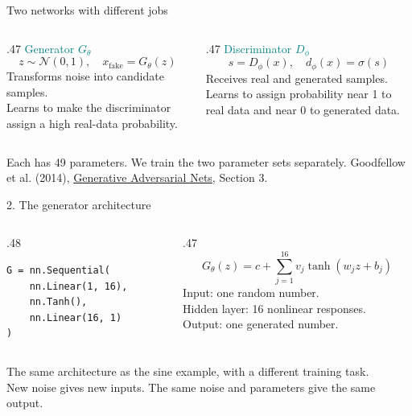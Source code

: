 \documentclass[aspectratio=169,11pt]{beamer}
\newcommand{\ganref}{\vfill{\tiny\color{gray}Goodfellow et al. (2014), \href{https://arxiv.org/abs/1406.2661}{Generative Adversarial Nets}, Section 3.}}
\begin{document}
\begin{frame}{Two networks with different jobs}
\begin{columns}[t]
\begin{column}{.47\textwidth}
\textcolor{Teal}{\large Generator $G_\theta$}
\[z\sim\mathcal N(0,1),\quad x_{\mathrm{fake}}=G_\theta(z)\]
Transforms noise into candidate samples.\\[4mm]
Learns to make the discriminator assign a high real-data probability.
\end{column}
\begin{column}{.47\textwidth}
\textcolor{Teal}{\large Discriminator $D_\phi$}
\[s=D_\phi(x),\quad d_\phi(x)=\sigma(s)\]
Receives real and generated samples.\\[4mm]
Learns to assign probability near 1 to real data and near 0 to generated data.
\end{column}
\end{columns}
\vspace{7mm}
Each has 49 parameters. We train the two parameter sets separately.
\ganref
\end{frame}

\begin{frame}[fragile]{2. The generator architecture}
\begin{columns}[c]
\begin{column}{.48\textwidth}
\begin{lstlisting}
G = nn.Sequential(
    nn.Linear(1, 16),
    nn.Tanh(),
    nn.Linear(16, 1)
)
\end{lstlisting}
\end{column}
\begin{column}{.47\textwidth}
\[G_\theta(z)=c+\sum_{j=1}^{16}v_j\tanh(w_jz+b_j)\]
\small
Input: one random number.\\[3mm]
Hidden layer: 16 nonlinear responses.\\[3mm]
Output: one generated number.
\end{column}
\end{columns}
\vspace{6mm}
The same architecture as the sine example, with a different training task.\\[3mm]
New noise gives new inputs. The same noise and parameters give the same output.
\end{frame}
\end{document}
